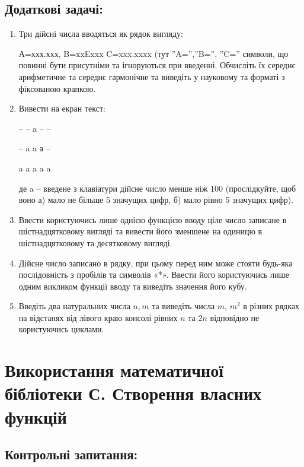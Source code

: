 \documentclass[a5paper,titlepage,openany,twoside,draft]{book_unv}%
\begin{document}
\section{Додаткові задачі:}

\begin{enumerate}
\def\labelenumi{\arabic{enumi}.}
\setcounter{enumi}{19}
\item
Три дійсні числа вводяться як рядок вигляду:

А=ххх.ххх, B=xxExxx C=xxx.xxxx (тут ''A='',''B='', ''C='' символи, що
повинні бути присутніми та ігноруються при введенні. Обчисліть їх
середнє арифметичне та середнє гармонічне та виведіть у науковому та
форматі з фіксованою крапкою.

\item
Вивести на екран текст:

-- \textbar{} -- \textbar{} a \textbar{} -- \textbar{} --

-- \textbar{} a \textbar{} a \textbar{} а \textbar{} --

a \textbar{} a \textbar{} a \textbar{} a \textbar{} a

де a -- введене з клавіатури дійсне число менше ніж 100 (прослідкуйте, щоб
воно а) мало не більше 5 значущих цифр, б) мало рівно 5 значущих цифр).

\item
Ввести користуючись лише однією функцією вводу ціле число записане в шістнадцятковому вигляді та вивести його зменшене на одиницю в шістнадцятковому та десятковому вигляді.

\item
Дійсне число записано в рядку, при цьому перед ним може стояти будь-яка послідовність з пробілів та символів «*». Ввести його користуючись лише одним викликом функції вводу та виведіть значення його кубу.

\item
Введіть два натуральних числа $n, m$ та виведіть числа $m$, $m^{2}$ в різних рядках
на відстанях від лівого краю консолі рівних $n$ та $2n$ відповідно не користуючись циклами.

\end{enumerate}

\chapter{ Використання математичної бібліотеки С. Створення власних функцій }
%

\section{Контрольні запитання:}
\end{document}
